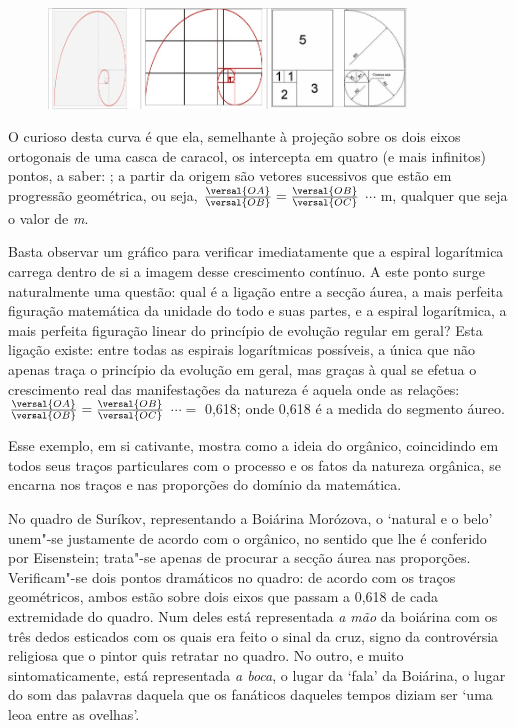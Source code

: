 \begin{figure}[!ht]
\centering
  \includegraphics[width=95mm]{./imgs/fig7.jpg}
\end{figure}

O curioso desta curva é que ela, semelhante à projeção sobre os dois
eixos ortogonais de uma casca de caracol, os intercepta em quatro (e
mais infinitos) pontos, a saber: ; a partir da origem  são
vetores sucessivos que estão em progressão geométrica, ou seja, $\frac{\versal{OA}}{\versal{OB}}=\frac{\versal{OB}}{\versal{OC}}$ $\cdots{}$ m, qualquer que seja o valor de \emph{m}.

Basta observar um gráfico para verificar imediatamente que a espiral
logarítmica carrega dentro de si a imagem desse crescimento contínuo. A
este ponto surge naturalmente uma questão: qual é a ligação entre a
secção áurea, a mais perfeita figuração matemática da unidade do todo e
suas partes, e a espiral logarítmica, a mais perfeita figuração linear
do princípio de evolução regular em geral? Esta ligação existe: entre
todas as espirais logarítmicas possíveis, a única que não apenas traça o
princípio da evolução em geral, mas graças à qual se efetua o
crescimento real das manifestações da natureza é aquela onde as
relações: $\frac{\versal{OA}}{\versal{OB}}=\frac{\versal{OB}}{\versal{OC}}$ $\cdots{} =$
0,618; onde 0,618 é a medida do segmento áureo.

Esse exemplo, em si cativante, mostra como a ideia do orgânico,
coincidindo em todos seus traços particulares com o processo e os fatos
da natureza orgânica, se encarna nos traços e nas proporções do domínio
da matemática.

No quadro de Suríkov, representando a Boiárina Morózova, o `natural e o
belo' unem"-se justamente de acordo com o orgânico, no sentido que lhe é
conferido por Eisenstein; trata"-se apenas de procurar a secção áurea nas
proporções. Verificam"-se dois pontos dramáticos no quadro: de acordo com
os traços geométricos, ambos estão sobre dois eixos que passam a 0,618
de cada extremidade do quadro. Num deles está representada \emph{a
mão} da boiárina com os três dedos esticados com os quais era feito o
sinal da cruz, signo da controvérsia religiosa que o pintor quis
retratar no quadro. No outro, e muito sintomaticamente, está
representada \emph{a boca}, o lugar da `fala' da Boiárina, o lugar do
som das palavras daquela que os fanáticos daqueles tempos diziam ser
`uma leoa entre as ovelhas'.

